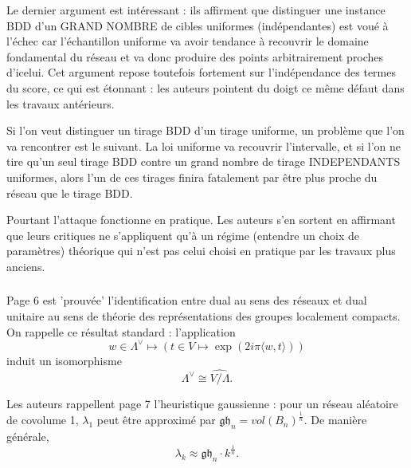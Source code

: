 \documentclass{article}
\begin{document}
Le dernier argument est intéressant : ils affirment que distinguer une instance BDD d'un GRAND NOMBRE de cibles uniformes (indépendantes) est voué à l'échec car l'échantillon uniforme va avoir tendance à recouvrir le domaine fondamental du réseau et va donc produire des points arbitrairement proches d'icelui. Cet argument repose toutefois fortement sur l'indépendance des termes du score, ce qui est étonnant : les auteurs pointent du doigt ce même défaut dans les travaux antérieurs.   

Si l'on veut distinguer un tirage BDD d'un tirage uniforme, un problème que l'on va rencontrer est le suivant. La loi uniforme va recouvrir l'intervalle, et si l'on ne tire qu'un seul tirage BDD contre un grand nombre de tirage INDEPENDANTS uniformes, alors l'un de ces tirages finira fatalement par être plus proche du réseau que le tirage BDD.

Pourtant l'attaque fonctionne en pratique. Les auteurs s'en sortent en affirmant que leurs critiques ne s'appliquent qu'à un régime (entendre un choix de paramètres) théorique qui n'est pas celui choisi en pratique par les travaux plus anciens.

\subsubsection{}

Page 6 est 'prouvée' l'identification entre dual au sens des réseaux et dual unitaire au sens de théorie des représentations des groupes localement compacts. On rappelle ce résultat standard : l'application 
$$w \in \Lambda^\vee \mapsto \left(t\in V \mapsto \exp(2i\pi \langle w,t \rangle)\right)$$ 
induit un isomorphisme $$\Lambda^\vee \cong \widehat{V/\Lambda}.$$ 

Les auteurs rappellent page 7 l'heuristique gaussienne : pour un réseau aléatoire de covolume 1, $\lambda_1$ peut être approximé par $\mathfrak{gh}_n = vol(B_n)^{\frac{1}{n}}$. De manière générale,
$$\lambda_k \approx \mathfrak{gh}_n \cdot k^{\frac{1}{n}}.$$ %
\end{document}
